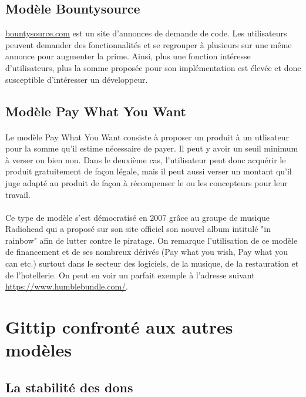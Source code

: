     \subsection{Modèle Bountysource}

\url{bountysource.com} est un site d'annonces de demande de code. Les
utilisateurs peuvent demander des fonctionnalités et se regrouper à plusieurs
sur une même annonce pour augmenter la prime. Ainsi, plus une fonction
intéresse d'utilisateurs, plus la somme proposée pour son implémentation est
élevée et donc susceptible d'intéresser un développeur.

    \subsection{Modèle Pay What You Want}

    \paragraph{} Le modèle Pay What You Want consiste à proposer un produit à
    un utlisateur pour la somme qu'il estime nécessaire de payer. Il peut y
    avoir un seuil minimum à verser ou bien non. Dans le deuxième cas,
    l'utilisateur peut donc acquérir le produit gratuitement de façon légale,
    mais il peut aussi verser un montant qu'il juge adapté au produit de façon
    à récompenser le ou les concepteurs pour leur travail.

    \paragraph{} Ce type de modèle s'est démocratisé en 2007 grâce au groupe de
    musique Radiohead qui a proposé sur son site officiel son nouvel album
    intitulé "in rainbow" afin de lutter contre le piratage. On remarque
    l'utilisation de ce modèle de financement et de ses nombreux dérivés (Pay
    what you wish, Pay what you can etc.) surtout dans le secteur des
    logiciels, de la musique, de la restauration et de l'hotellerie. On peut en
    voir un parfait exemple à l'adresse suivant
    \url{https://www.humblebundle.com/}.


\section{Gittip confronté aux autres modèles}

\subsection{La stabilité des dons}


